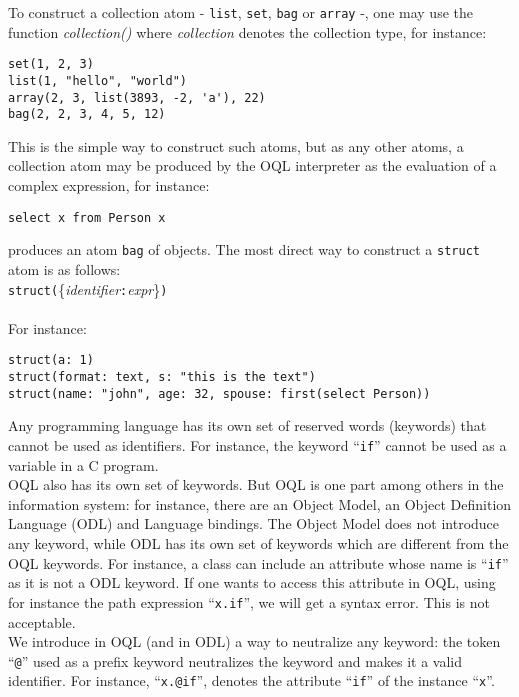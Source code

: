 To construct a collection atom - \texttt{list}, \texttt{set}, \texttt{bag}
or \texttt{array} -, one may use the
function \emph{collection()} where \emph{collection} denotes the
collection type, for instance:
\verbsize
\begin{verbatim}
set(1, 2, 3)
list(1, "hello", "world")
array(2, 3, list(3893, -2, 'a'), 22)
bag(2, 2, 3, 4, 5, 12)
\end{verbatim}
\normalsize
This is the simple way to construct such atoms, but as any other atoms,
a collection atom may be produced by the OQL interpreter as the evaluation
of a complex expression, for instance:
\verbsize
\begin{verbatim}
select x from Person x
\end{verbatim}
\normalsize
produces an atom \texttt{bag} of objects.
The most direct way to construct a \texttt{struct} atom is as follows:\\
\texttt{struct(}\{\emph{identifier}\texttt{:}\emph{expr}\}\texttt{)}\\
\\
For instance:
\verbsize
\begin{verbatim}
struct(a: 1)
struct(format: text, s: "this is the text")
struct(name: "john", age: 32, spouse: first(select Person))
\end{verbatim}
\normalsize
{}
Any programming language has its own set of reserved words (keywords)
that cannot be used as identifiers. For instance, the keyword ``\texttt{if}''
cannot be used as a variable in a C program.\\
OQL also has its own set of keywords.
But OQL is one part among others in
the information system: for instance, there are an Object Model,
an Object Definition Language (ODL) and Language bindings.
The Object Model does not introduce
any keyword, while ODL has its own set of keywords which are different
from the OQL keywords. For instance, a class can include an
attribute whose name is ``\texttt{if}'' as it is not a ODL keyword.
If one wants to access this attribute in OQL, using for instance
the path expression ``\texttt{x.if}'', we will get a syntax error.
This is not acceptable.\\
We introduce in OQL (and in ODL) a way to neutralize any keyword:
the token ``\texttt{@}'' used as a prefix keyword neutralizes
the keyword and makes it a valid identifier. For instance, ``\texttt{x.@if}'',
denotes the attribute ``\texttt{if}'' of the instance ``\texttt{x}''.\\
